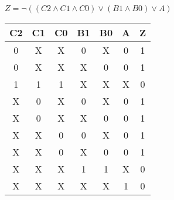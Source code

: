 
\begin{center}
    {\(Z = \lnot ((C2 \land C1 \land C0) \lor (B1 \land B0) \lor A) \)}
    \begin{table}[h] %
        \begin{center}
            \begin{tabular}{|c|c|c|c|c|c||c|} \hline
            C2 & C1 & C0 & B1 & B0 & A & Z \\ \hline\hline
            0  & X  & X  & 0  & X  & 0 & 1 \\ \hline
            0  & X  & X  & X  & 0  & 0 & 1 \\ \hline
            1  & 1  & 1  & X  & X  & X & 0 \\ \hline
            X  & 0  & X  & 0  & X  & 0 & 1 \\ \hline
            X  & 0  & X  & X  & 0  & 0 & 1 \\ \hline
            X  & X  & 0  & 0  & X  & 0 & 1 \\ \hline
            X  & X  & 0  & X  & 0  & 0 & 1 \\ \hline
            X  & X  & X  & 1  & 1  & X & 0 \\ \hline
            X  & X  & X  & X  & X  & 1 & 0 \\ \hline
            \end{tabular}
        \end{center}
    \end{table}
\end{center}
